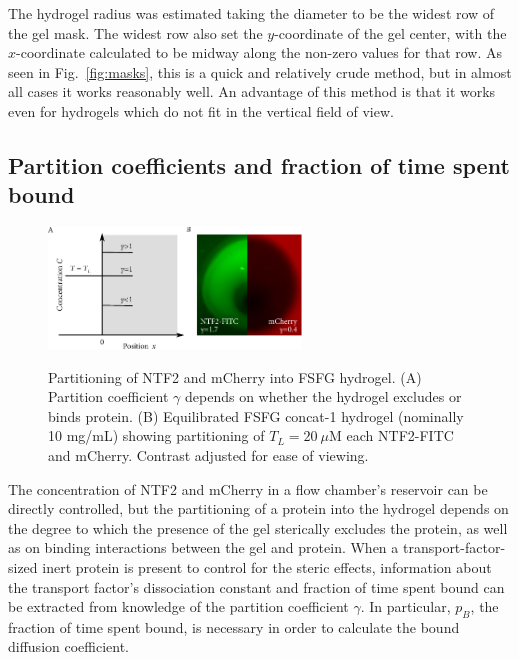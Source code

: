 The hydrogel radius was estimated taking the diameter to be the widest row of the gel mask.  The widest row also set the $y$-coordinate of the gel center, with the $x$-coordinate calculated to be midway along the non-zero values for that row.  As seen in Fig.~\ref{fig:masks}, this is a quick and relatively crude method, but in almost all cases it works reasonably well.  An advantage of this method is that it works even for hydrogels which do not fit in the vertical field of view.

\subsection{Partition coefficients and fraction of time spent bound}
\label{sec:part-coeff}

\begin{figure} 
\caption[Partitioning of NTF2 and mCherry into FSFG hydrogel.]{Partitioning of NTF2 and mCherry into FSFG hydrogel.  (A) Partition coefficient $\gamma$ depends on whether the hydrogel excludes or binds protein. (B) Equilibrated FSFG concat-1 hydrogel (nominally 10 mg/mL) showing partitioning of $T_L = 20\ \mu$M each NTF2-FITC and mCherry.  Contrast adjusted for ease of viewing.\\}
\centering
\includegraphics[width=0.6\textwidth]{figs/ch04/partition.pdf}
\label{fig:partition}
\end{figure}

The concentration of NTF2 and mCherry in a flow chamber's reservoir can be directly controlled, but the partitioning of a protein into the hydrogel depends on the degree to which the presence of the gel sterically excludes the protein, as well as on binding interactions between the gel and protein.  When a transport-factor-sized inert protein is present to control for the steric effects, information about the transport factor's dissociation constant and fraction of time spent bound can be extracted from knowledge of the partition coefficient $\gamma$.  In particular, $p_B$, the fraction of time spent bound, is necessary in order to calculate the bound diffusion coefficient.

